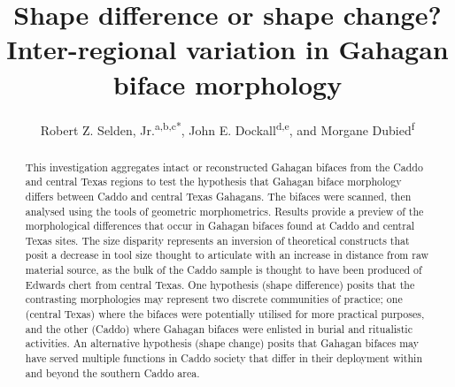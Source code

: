 \documentclass[review]{elsarticle}
\begin{document}
\begin{frontmatter}


\title{Shape difference or shape change? Inter-regional variation in Gahagan biface morphology}



\author{Robert Z. Selden, Jr.\textsuperscript{a,b,c*}, John E. Dockall\textsuperscript{d,e}, and Morgane Dubied\textsuperscript{f}}
\address[1]{Heritage Research Center, Stephen F. Austin State University, United States}
\address[2]{Cultural Heritage Department, Jean Monnet University, France}
\address[3]{ORCID ID \href{http://orcid.org/0000-0002-1789-8449}{0000-0002-1789-8449}}
\address[4]{Prewitt and Associates, Inc., United States}
\address[5]{ORCID ID \href{http://orcid.org/0000-0002-0940-7144}{0000-0002-0940-7144}}
\address[6]{UMR 6282, Laboratoire Biogéosciences, Université de Bourgogne, France}

\begin{abstract}
This investigation aggregates intact or reconstructed Gahagan bifaces from the Caddo and central Texas regions to test the hypothesis that Gahagan biface morphology differs between Caddo and central Texas Gahagans. The bifaces were scanned, then analysed using the tools of geometric morphometrics. Results provide a preview of the morphological differences that occur in Gahagan bifaces found at Caddo and central Texas sites. The size disparity represents an inversion of theoretical constructs that posit a decrease in tool size thought to articulate with an increase in distance from raw material source, as the bulk of the Caddo sample is thought to have been produced of Edwards chert from central Texas. One hypothesis (shape difference) posits that the contrasting morphologies may represent two discrete communities of practice; one (central Texas) where the bifaces were potentially utilised for more practical purposes, and the other (Caddo) where Gahagan bifaces were enlisted in burial and ritualistic activities. An alternative hypothesis (shape change) posits that Gahagan bifaces may have served multiple functions in Caddo society that differ in their deployment within and beyond the southern Caddo area.
\end{abstract}


\end{frontmatter}
\end{document}
